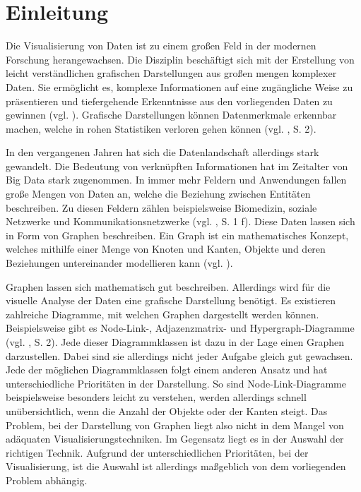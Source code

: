 
\chapter{Einleitung}

Die Visualisierung von Daten ist zu einem großen Feld in der modernen Forschung herangewachsen. Die Disziplin beschäftigt sich mit der Erstellung von leicht verständlichen grafischen Darstellungen aus großen mengen komplexer Daten. Sie ermöglicht es, komplexe Informationen auf eine zugängliche Weise zu präsentieren und tiefergehende Erkenntnisse aus den vorliegenden Daten zu gewinnen (vgl. \cite{wiki:DataVisualization}). Grafische Darstellungen können Datenmerkmale erkennbar machen, welche in rohen Statistiken verloren gehen können (vgl. \cite{unwin:WhyDataVisualization}, S. 2).

In den vergangenen Jahren hat sich die Datenlandschaft allerdings stark gewandelt. Die Bedeutung von verknüpften Informationen hat im Zeitalter von Big Data stark zugenommen. In immer mehr Feldern und Anwendungen fallen große Mengen von Daten an, welche die Beziehung zwischen Entitäten beschreiben. Zu diesen Feldern zählen beispielsweise Biomedizin, soziale Netzwerke und Kommunikationsnetzwerke (vgl. \cite{chen:SurveyGraphVisualization}, S. 1 f). Diese Daten lassen sich in Form von Graphen beschreiben. Ein Graph ist ein mathematisches Konzept, welches mithilfe einer Menge von Knoten und Kanten, Objekte und deren Beziehungen untereinander modellieren kann (vgl. \cite{wiki:Graph}).

Graphen lassen sich mathematisch gut beschreiben. Allerdings wird für die visuelle Analyse der Daten eine grafische Darstellung benötigt. Es existieren zahlreiche Diagramme, mit welchen Graphen dargestellt werden können. Beispielsweise gibt es Node-Link-, Adjazenzmatrix- und Hypergraph-Diagramme (vgl. \cite{chen:SurveyGraphVisualization}, S. 2). Jede dieser Diagrammklassen ist dazu in der Lage einen Graphen darzustellen. Dabei sind sie allerdings nicht jeder Aufgabe gleich gut gewachsen. Jede der möglichen Diagrammklassen folgt einem anderen Ansatz und hat unterschiedliche Prioritäten in der Darstellung. So sind Node-Link-Diagramme beispielsweise besonders leicht zu verstehen, werden allerdings schnell unübersichtlich, wenn die Anzahl der Objekte oder der Kanten steigt. Das Problem, bei der Darstellung von Graphen liegt also nicht in dem Mangel von adäquaten Visualisierungstechniken. Im Gegensatz liegt es in der Auswahl der richtigen Technik. Aufgrund der unterschiedlichen Prioritäten, bei der Visualisierung, ist die Auswahl ist allerdings maßgeblich von dem vorliegenden Problem abhängig.

